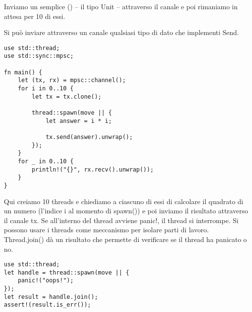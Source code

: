 Inviamo un semplice () – il tipo Unit – attraverso il canale e poi
rimaniamo in attesa per 10 di essi.

Si può inviare attraverso un canale qualsiasi tipo di dato che implementi
Send.

\begin{lstlisting}
use std::thread;
use std::sync::mpsc;

fn main() {
    let (tx, rx) = mpsc::channel();
    for i in 0..10 {
        let tx = tx.clone();

        thread::spawn(move || {
            let answer = i * i;

            tx.send(answer).unwrap();
        });
    }
    for _ in 0..10 {
        println!("{}", rx.recv().unwrap());
    }
}
\end{lstlisting}

Qui creiamo 10 threads e chiediamo a ciascuno di essi di calcolare il
quadrato di un numero (l’indice i al momento di spawn()) e poi inviamo il
risultato attraverso il canale tx.
Se all’interno del thread avviene panic!, il thread si interrompe.
Si possono usare i threads come meccanismo per isolare parti di lavoro.
Thread.join() dà un risultato che permette di verificare se il thread ha
panicato o no.

\begin{lstlisting}
use std::thread;
let handle = thread::spawn(move || {
    panic!("oops!");
});
let result = handle.join();
assert!(result.is_err());
\end{lstlisting}
